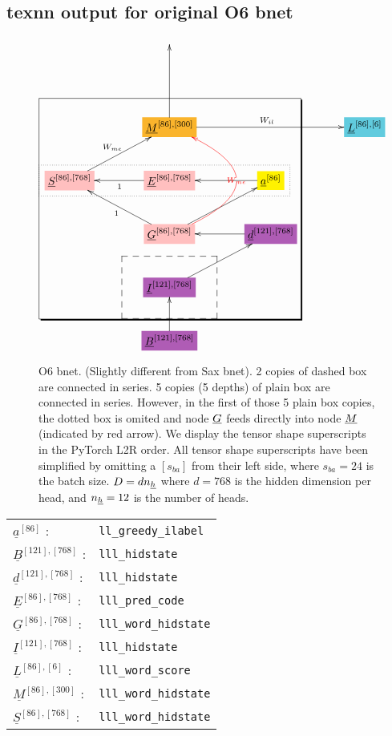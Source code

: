 \documentclass[12pt]{article}
\begin{document}
\subsection{texnn output for
original O6  bnet}
\begin{figure}[h!]\centering
$$\xymatrix@R=2.5pc@C=3.5pc{
&&&
\\
&&&
\\
&*+[F*:Dandelion]{\underline{M}^{[86], [300]}}\ar[uu]\ar[rr]^{W_{il}}&&*+[F*:SkyBlue]{\underline{L}^{[86], [6]}}
\\
*+[F*:pink]{\underline{S}^{[86], [768]}}\ar[ur]^{W_{me}}&*+[F*:pink]{\underline{E}^{[86], [768]}}\ar[l]^{1}&*+[F*:yellow]{\underline{a}^{[86]}}\ar[l]&
\\
&*+[F*:pink]{\underline{G}^{[86], [768]}}\ar[ur]\ar@[red]@/_5pc/[uu]|-{\color{red} W_{me}}\ar[ul]^{1}&*+[F*:Orchid]{\underline{d}^{[121], [768]}}\ar[l]&
\\
&*+[F*:Orchid]{\underline{I}^{[121], [768]}}\ar[ur]&&
\\
&*+[F*:Orchid]{\underline{B}^{[121], [768]}}\ar[u]&&
\save
\POS"3,1"."6,1"."3,3"."6,3"!C*+<4.8em>\frm{-,}
\POS"6,2"."6,2"."6,2"."6,2"!C*+<3.8em>\frm{--}
\POS"4,1"."4,1"."4,3"."4,3"!C*+<1.0em>\frm{.}
\restore
}$$
\caption{O6 bnet. (Slightly different from Sax bnet). 2 copies of dashed box are connected in series. 5 copies  (5 depths) of plain box are connected in series.  However, in the first of those 5 plain box copies, the dotted box  is omited and node $\underline{G}$ feeds directly into node  $\underline{M}$ (indicated by red arrow). We display the tensor shape superscripts in the PyTorch L2R order. All tensor shape superscripts have been simplified by omitting a $[s_{ba}]$ from their left side, where $s_{ba}=24$ is the batch size. $D= d n_{\underline{h}}$ where $d=768$ is the hidden dimension per head, and $n_{\underline{h}}=12$ is the number of heads. }
\label{fig-texnn-for-sentence-ax-o6-bnet}
\end{figure}

\begin{tabular}{ll}
$\underline{a}^{[86]}$ :&{\tt ll\_greedy\_ilabel}\\
$\underline{B}^{[121], [768]}$ :&{\tt lll\_hidstate}\\
$\underline{d}^{[121], [768]}$ :&{\tt lll\_hidstate}\\
$\underline{E}^{[86], [768]}$ :&{\tt lll\_pred\_code}\\
$\underline{G}^{[86], [768]}$ :&{\tt lll\_word\_hidstate}\\
$\underline{I}^{[121], [768]}$ :&{\tt lll\_hidstate}\\
$\underline{L}^{[86], [6]}$ :&{\tt lll\_word\_score}\\
$\underline{M}^{[86], [300]}$ :&{\tt lll\_word\_hidstate}\\
$\underline{S}^{[86], [768]}$ :&{\tt lll\_word\_hidstate}
\end{tabular}
\end{document}
